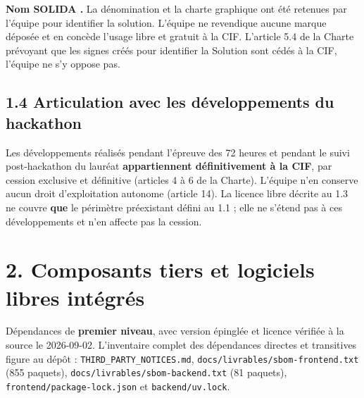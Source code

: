 \documentclass[11pt,a4paper]{article}
\begin{document}
\textbf{Nom \og SOLIDA \fg{}.} La dénomination et la charte graphique ont été retenues par
l'équipe pour identifier la solution. L'équipe ne revendique aucune marque déposée et en concède
l'usage libre et gratuit à la CIF. L'article 5.4 de la Charte prévoyant que les signes créés pour
identifier la Solution sont cédés à la CIF, l'équipe ne s'y oppose pas.

\subsection*{1.4 Articulation avec les développements du hackathon}

Les développements réalisés pendant l'épreuve des 72 heures et pendant le suivi post-hackathon du
lauréat \textbf{appartiennent définitivement à la CIF}, par cession exclusive et définitive
(articles 4 à 6 de la Charte). L'équipe n'en conserve aucun droit d'exploitation autonome
(article 14). La licence libre décrite au 1.3 ne couvre \textbf{que} le périmètre préexistant
défini au 1.1 ; elle ne s'étend pas à ces développements et n'en affecte pas la cession.

\section*{2. Composants tiers et logiciels libres intégrés}

Dépendances de \textbf{premier niveau}, avec version épinglée et licence vérifiée à la source le
2026-09-02. L'inventaire complet des dépendances directes et transitives figure au dépôt :
\texttt{THIRD\_PARTY\_NOTICES.md}, \texttt{docs/livrables/sbom-frontend.txt} (855 paquets),
\texttt{docs/livrables/sbom-backend.txt} (81 paquets), \texttt{frontend/package-lock.json} et
\texttt{backend/uv.lock}.
\end{document}

